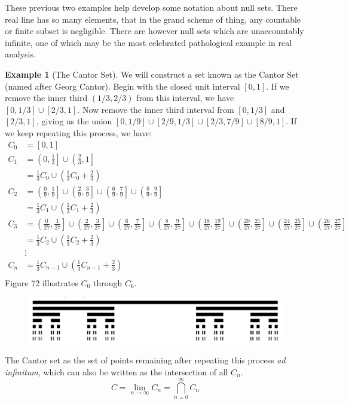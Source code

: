 \documentclass{article}
\theoremstyle{definition}
\newtheorem{example}{Example}[section]
\begin{document}
	These previous two examples help develop some notation about null sets. There real line has so many elements, that in the grand scheme of thing, any countable or finite subset is negligible. There are however null sets which are unaccountably infinite, one of which may be the most celebrated pathological example in real analysis. 
	\begin{example}[The Cantor Set]
		We will construct a set known as the Cantor Set (named after Georg Cantor). Begin with the closed unit interval $ [0,1] $. If we remove the inner third $ (1/3,2/3) $ from this interval, we have $ [0,1/3]\cup [2/3,1] $. Now remove the inner third interval from $  [0,1/3] $ and $ [2/3,1] $, giving us the union $[0,1/9]\cup [2/9,1/3]\cup[2/3,7/9]\cup[8/9,1]$. If we keep repeating this process, we have:
		\begin{align*}
			C_0 &= [0,1]\\
			C_1 &= \left(0,\frac{1}{3}\right]\cup \left(\frac{2}{3},1\right]\\
			& = \frac{1}{3}C_0 \cup \left(\frac{1}{3}C_0 + \frac{2}{3}\right)\\
			C_2 &= \left(\frac{0}{9},\frac{1}{9}\right]\cup  \left(\frac{2}{9},\frac{3}{9}\right]\cup \left(\frac{6}{9},\frac{7}{9}\right]\cup \left(\frac{8}{9},\frac{9}{9}\right]\\
			& = \frac{1}{3}C_1 \cup \left(\frac{1}{3}C_1 + \frac{2}{3}\right)\\
			C_3 & = \left(\frac{0}{27},\frac{1}{27}\right]\cup  \left(\frac{2}{27},\frac{3}{27}\right]\cup
			\left(\frac{6}{27},\frac{7}{27}\right]\cup  \left(\frac{8}{27},\frac{9}{27}\right]\cup
			\left(\frac{18}{27},\frac{19}{27}\right]\cup  \left(\frac{20}{27},\frac{21}{27}\right]\cup
			\left(\frac{24}{27},\frac{25}{27}\right]\cup  \left(\frac{26}{27},\frac{27}{27}\right]\\ 
			& = \frac{1}{3}C_2 \cup \left(\frac{1}{3}C_2 + \frac{2}{3}\right)\\
			&\vdots\\
			C_n& = \frac{1}{3}C_{n-1} \cup \left(\frac{1}{3}C_{n-1} + \frac{2}{3}\right)\\
		\end{align*}
		Figure 72 illustrates $ C_0 $ through $ C_6 $.
		\begin{figure}[h!]
			\centering
			\includegraphics[width=0.9\linewidth]{figures/cantor}
			\caption{}
		\end{figure}
		The Cantor set as the set of points remaining after repeating this process \textit{ad infinitum}, which can also be written as the intersection of all $ C_n $.
		$$ C = \lim\limits_{n\to\infty} C_n=\bigcap_{n=0}^\infty C_n$$ 
		

\end{example}
\end{document}
